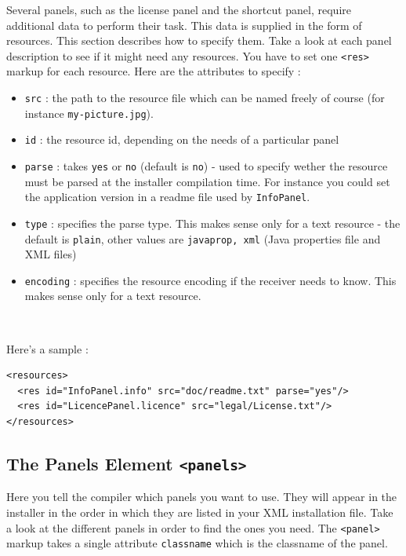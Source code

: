 Several panels, such as the license panel and the shortcut panel,
require additional data to perform their task. This data is supplied in
the form of resources. This section describes how to specify them. Take
a look at each panel description to see if it might need any resources.
You have to set one \texttt{<res>} markup for each resource. Here are
the attributes to specify :
\begin{itemize}

  \item \texttt{src} : the path to the resource file which can be named freely
  of course (for instance \texttt{my-picture.jpg}).
  \item \texttt{id} : the resource id, depending on the needs of a particular panel
  \item \texttt{parse} : takes \texttt{yes} or \texttt{no} (default is
  \texttt{no}) - used to specify wether the resource must be parsed at the
  installer compilation time. For instance you could set the application version
  in a readme file used by \texttt{InfoPanel}.
  \item \texttt{type} : specifies the parse type. This makes sense only for a text
  resource  - the default is \texttt{plain}, other values are \texttt{javaprop,
  xml} (Java properties file and XML files)
  \item \texttt{encoding} : specifies the resource encoding if the receiver needs
  to know. This makes sense only for a text resource.

\end{itemize}\

Here's a sample :
\footnotesize
\begin{verbatim}
<resources>
  <res id="InfoPanel.info" src="doc/readme.txt" parse="yes"/>
  <res id="LicencePanel.licence" src="legal/License.txt"/>
</resources>
\end{verbatim}
\normalsize

\subsection{The Panels Element \texttt{<panels>}}

Here you tell the compiler which panels you want to use. They will
appear in the installer in the order in which they are listed in your
XML installation file. Take a look at the different panels in order to
find the ones you need. The \texttt{<panel>} markup takes a single
attribute \texttt{classname} which is the classname of the panel.\\

